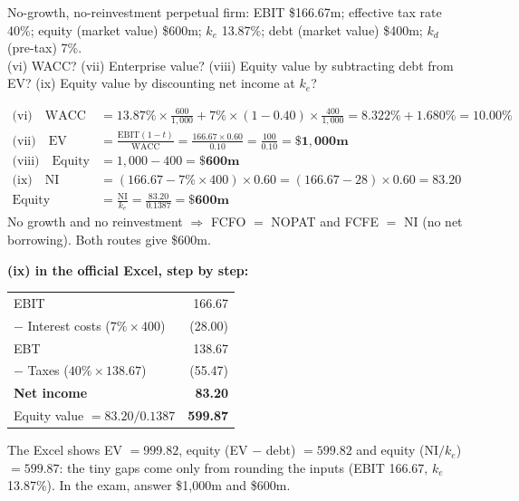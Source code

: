 \begin{exbox}
No-growth, no-reinvestment perpetual firm: EBIT \$166.67m; effective tax rate 40\%; equity (market value) \$600m; $k_e$ 13.87\%; debt (market value) \$400m; $k_d$ (pre-tax) 7\%.\\
(vi) WACC? (vii) Enterprise value? (viii) Equity value by subtracting debt from EV? (ix) Equity value by discounting net income at $k_e$?
\end{exbox}
\begin{exbox}
\begin{align*}
\text{(vi)}\quad \text{WACC} &= 13.87\%\times\tfrac{600}{1{,}000}+7\%\times(1-0.40)\times\tfrac{400}{1{,}000} = 8.322\%+1.680\% = \mathbf{10.00\%}\\
\text{(vii)}\quad \text{EV} &= \frac{\text{EBIT}(1-t)}{\text{WACC}} = \frac{166.67\times0.60}{0.10} = \frac{100}{0.10} = \mathbf{\$1{,}000m}\\
\text{(viii)}\quad \text{Equity} &= 1{,}000-400 = \mathbf{\$600m}\\
\text{(ix)}\quad \text{NI} &= (166.67-7\%\times400)\times0.60 = (166.67-28)\times0.60 = 83.20\\
\text{Equity} &= \frac{\text{NI}}{k_e} = \frac{83.20}{0.1387} = \mathbf{\$600m}
\end{align*}
No growth and no reinvestment $\Rightarrow$ FCFO $=$ NOPAT and FCFE $=$ NI (no net borrowing). Both routes give \$600m.

\medskip
\textbf{(ix) in the official Excel, step by step:}
\begin{center}
\begin{tabular}{@{}lr@{}}
\toprule
EBIT & 166.67\\
$-$ Interest costs ($7\%\times400$) & (28.00)\\
\midrule
EBT & 138.67\\
$-$ Taxes ($40\%\times138.67$) & (55.47)\\
\midrule
\textbf{Net income} & \textbf{83.20}\\
Equity value $=83.20/0.1387$ & \textbf{599.87}\\
\bottomrule
\end{tabular}
\end{center}
The Excel shows EV $=999.82$, equity (EV $-$ debt) $=599.82$ and equity (NI$/k_e$) $=599.87$: the tiny gaps come only from rounding the inputs (EBIT 166.67, $k_e$ 13.87\%). In the exam, answer \$1,000m and \$600m.
\end{exbox}

